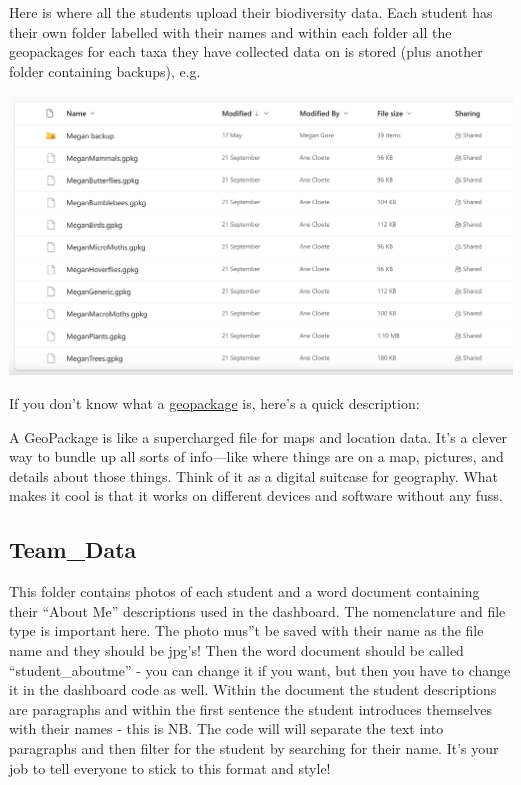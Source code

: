 \documentclass[
]{book}
\theoremstyle{definition}
\theoremstyle{definition}
\theoremstyle{definition}
\theoremstyle{definition}
\theoremstyle{remark}
\begin{document}
Here is where all the students upload their biodiversity data. Each student has their own folder labelled with their names and within each folder all the geopackages for each taxa they have collected data on is stored (plus another folder containing backups), e.g.~

\includegraphics{images/megan_folder.png}

If you don't know what a \href{https://www.geopackage.org/}{geopackage} is, here's a quick description:

A GeoPackage is like a supercharged file for maps and location data. It's a clever way to bundle up all sorts of info---like where things are on a map, pictures, and details about those things. Think of it as a digital suitcase for geography. What makes it cool is that it works on different devices and software without any fuss.

\hypertarget{team_data}{%
\subsection{Team\_Data}\label{team_data}}

This folder contains photos of each student and a word document containing their ``About Me'' descriptions used in the dashboard. The nomenclature and file type is important here. The photo mus''t be saved with their name as the file name and they should be jpg's! Then the word document should be called ``student\_aboutme'' - you can change it if you want, but then you have to change it in the dashboard code as well. Within the document the student descriptions are paragraphs and within the first sentence the student introduces themselves with their names - this is NB. The code will will separate the text into paragraphs and then filter for the student by searching for their name. It's your job to tell everyone to stick to this format and style!
\end{document}
